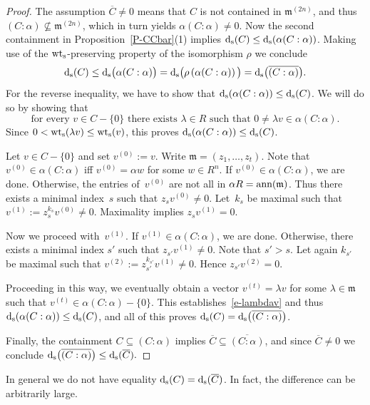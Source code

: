 \documentclass[11pt]{article}
\theoremstyle{definition}
\numberwithin{equation}{section}
\newcommand{\mm}{{\mathfrak m}}
\newcommand{\ann}{\mbox{\rm ann}}
\newcommand{\wts}{\mbox{${\rm wt}_{\rm s}$}}
\newcommand{\ds}{\mbox{${\rm d}_{\rm s}$}}
\newcommand{\ov}[1]{\mbox{$\overline{#1}$}}
\newcounter{alp}
\begin{document}
\begin{proof}
The assumption $\ov{C}\neq0$ means that $C$ is not contained in $\mm^{(2n)}$, and thus $(C:\alpha) \nsubseteq \mm^{(2n)}$, which in turn yields
$\alpha(C:\alpha) \neq 0$.
Now the second containment in Proposition~\ref{P-CCbar}(1) implies $\ds(C) \leq \ds(\alpha(C:\alpha))$.
Making use of the $\wts$-preserving property of the isomorphism $\rho$ we conclude
\[
  \ds(C) \leq \ds\big(\alpha(C:\alpha)\big) = \ds\big(\rho\left(\alpha(C:\alpha)\right)\big) = \ds\big(\overline{(C:\alpha)}\big).
\]
For the reverse inequality, we have to show that $\ds(\alpha(C:\alpha)) \leq \ds(C)$.
We will do so by showing that
\begin{equation}\label{e-lambdav}
  \text{for every $v \in C-\{0\}$ there exists $\lambda\in R$ such that $0 \neq \lambda v\in\alpha(C:\alpha)$.}
\end{equation}
Since $0<\wts(\lambda v) \leq \wts(v)$, this proves $\ds(\alpha(C:\alpha)) \leq \ds(C)$.

Let $v\in C-\{0\}$ and set $v^{(0)} := v$.
Write $\mm = (z_1, \ldots, z_t)$.
Note that $v^{(0)}\in \alpha(C:\alpha)$ iff $v^{(0)} = \alpha w$ for some $w\in R^n$.
If $v^{(0)}\in\alpha(C:\alpha)$, we are done.
Otherwise, the entries of~$v^{(0)}$ are not all in $\alpha R=\ann(\mm)$.
Thus there exists a minimal index~$s$ such that $z_sv^{(0)}\neq0$.
Let~$k_s$ be maximal such that $v^{(1)} := z_s^{k_s}v^{(0)} \neq  0$.
Maximality implies $z_sv^{(1)} = 0$.

Now we proceed with~$v^{(1)}$.
If $v^{(1)}\in \alpha(C:\alpha)$, we are done.
Otherwise, there exists a minimal index $s'$ such that $z_{s'}v^{(1)}\neq0$.
Note that $s'>s$.
Let again $k_{s'}$ be maximal such that $v^{(2)}:= z_{s'}^{k_{s'}}v^{(1)} \neq 0$.
Hence $z_{s'}v^{(2)} = 0$.

Proceeding in this way, we eventually obtain a vector $v^{(t)}=\lambda v$ for some $\lambda\in\mm$ such that
$v^{(t)}\in \alpha(C:\alpha)-\{0\}$.
This establishes~\eqref{e-lambdav} and thus $\ds(\alpha(C:\alpha)) \leq \ds(C)$, and all of this proves $\ds(C)=\ds\big(\ov{(C:\alpha)}\big)$.

Finally, the containment $C\subseteq (C:\alpha)$ implies $\ov{C}\subseteq \ov{(C:\alpha)}$, and since
$\ov{C} \neq 0$ we conclude $\ds\big(\ov{(C:\alpha)}\big) \leq \ds(\ov{C}).$
\end{proof}

In general we do not have equality $\ds(C)=\ds(\ov{C})$.
In fact, the difference can be arbitrarily large.
\end{document}
